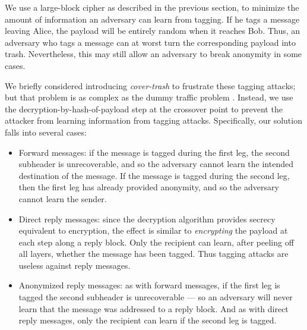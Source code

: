 \documentclass{llncs}
\begin{document}

We use a large-block cipher as described in the previous section, to
minimize the amount of information an adversary can learn from tagging.
If he tags a message
leaving Alice, the payload will be entirely random when it reaches
Bob.  Thus, an adversary who tags a message can at worst turn the
corresponding payload into trash.  
Nevertheless, this may still allow an adversary to
break anonymity in some cases.

We briefly considered introducing \emph{cover-trash} to frustrate
these tagging attacks; but that problem is as complex as the dummy
traffic problem \cite{langos02}. Instead, we use the decryption-by-hash-of-payload step at the
crossover point to prevent the attacker from learning information from
tagging attacks.  Specifically, our solution falls into several cases:

\begin{itemize}
\item Forward messages: if the message is tagged during the first leg,
the second subheader is unrecoverable, and so the adversary cannot
learn the intended destination of the message. If the message is tagged
during the second leg, then the first leg has already provided anonymity,
and so the adversary cannot learn the sender.
\item Direct reply messages: since the decryption algorithm provides
secrecy equivalent to encryption, the effect is similar to {\em encrypting}
the payload at each step along a reply block. Only the recipient can learn,
after peeling off all layers, whether the message has been tagged. Thus
tagging attacks are useless against reply messages.
\item Anonymized reply messages: as with forward messages, if the first leg
is tagged the second subheader is unrecoverable --- so an adversary will
never learn that the message was addressed to a reply block. And as with
direct reply messages, only the recipient can learn if the second leg is
tagged.
\end{itemize}
\end{document}
